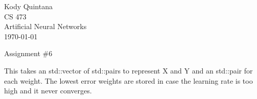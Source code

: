 \documentclass[14pt]{article}
\begin{document}
\begin{flushleft}
 
\large
Kody Quintana\\
CS 473\\
Artificial Neural Networks\\
\today\\
\boldmath

\begin{center}
Assignment \#6
\end{center}
This takes an std::vector of std::pairs to represent X and Y and an std::pair for each weight.
The lowest error weights are stored in case the learning rate is too high and it never converges.
\end{flushleft}
\end{document}
